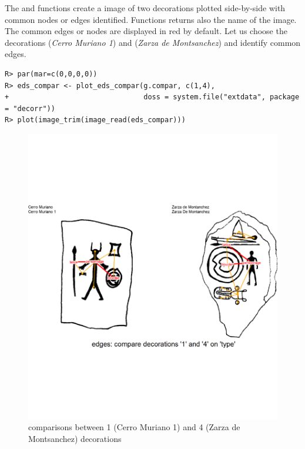\documentclass[article]{jss}\usepackage{knitr}
\begin{document}
The and  functions create a  image of two decorations plotted side-by-side with common nodes or edges identified. Functions returns also the name of the image. The common edges or nodes are displayed in red by default.
Let us choose the decorations  (\emph{Cerro Muriano 1}) and  (\emph{Zarza de Montsanchez}) and identify common edges.

\begin{kframe}
\begin{verbatim}
R> par(mar=c(0,0,0,0))
R> eds_compar <- plot_eds_compar(g.compar, c(1,4),
+                                doss = system.file("extdata", package = "decorr"))
R> plot(image_trim(image_read(eds_compar)))
\end{verbatim}
\end{kframe}\begin{figure}[H]

{\centering \includegraphics[width=\maxwidth]{figure/unnamed-chunk-12-1} 

}

\caption{\label{fig:figs}comparisons between 1 (Cerro Muriano 1) and 4 (Zarza de Montsanchez) decorations}\label{fig:unnamed-chunk-12}
\end{figure}
\end{document}
